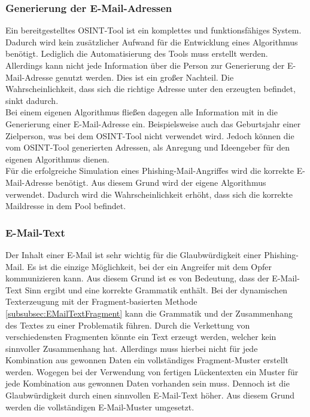 	\subsubsection{Generierung der E-Mail-Adressen}
	Ein bereitgestelltes OSINT-Tool ist ein komplettes und funktionsfähiges System. Dadurch wird kein zusätzlicher Aufwand für die Entwicklung eines Algorithmus benötigt. Lediglich die Automatisierung des Tools muss erstellt werden. Allerdings kann nicht jede Information über die Person zur Generierung der E-Mail-Adresse genutzt werden. Dies ist ein großer Nachteil. Die Wahrscheinlichkeit, dass sich die richtige Adresse unter den erzeugten befindet, sinkt dadurch.\\
	Bei einem eigenen Algorithmus fließen dagegen alle Information mit in die Generierung einer E-Mail-Adresse ein. Beispielsweise auch das Geburtsjahr einer Zielperson, was bei dem OSINT-Tool \cite{EmailAssumptions} nicht verwendet wird. Jedoch können die vom OSINT-Tool generierten Adressen, als Anregung und Ideengeber für den eigenen Algorithmus dienen.\\
	Für die erfolgreiche Simulation eines Phishing-Mail-Angriffes wird die korrekte E-Mail-Adresse benötigt. Aus diesem Grund wird der eigene Algorithmus verwendet. Dadurch wird die Wahrscheinlichkeit erhöht, dass sich die korrekte Maildresse in dem Pool befindet.
	
	\subsubsection{E-Mail-Text}
	Der Inhalt einer E-Mail ist sehr wichtig für die Glaubwürdigkeit einer Phishing-Mail. Es ist die einzige Möglichkeit, bei der ein Angreifer mit dem Opfer kommunizieren kann. Aus diesem Grund ist es von Bedeutung, dass der E-Mail-Text Sinn ergibt und eine korrekte Grammatik enthält. Bei der dynamischen Texterzeugung mit der Fragment-basierten Methode \ref{subsubsec:EMailTextFragment} kann die Grammatik und der Zusammenhang des Textes zu einer Problematik führen. Durch die Verkettung von verschiedensten Fragmenten könnte ein Text erzeugt werden, welcher kein sinnvoller Zusammenhang hat. Allerdings muss hierbei nicht für jede Kombination aus gewonnen Daten ein vollständiges Fragment-Muster erstellt werden. Wogegen bei der Verwendung von fertigen Lückentexten ein Muster für jede Kombination aus gewonnen Daten vorhanden sein muss. Dennoch ist die Glaubwürdigkeit durch einen sinnvollen E-Mail-Text höher. Aus diesem Grund werden die vollständigen E-Mail-Muster umgesetzt.


	
